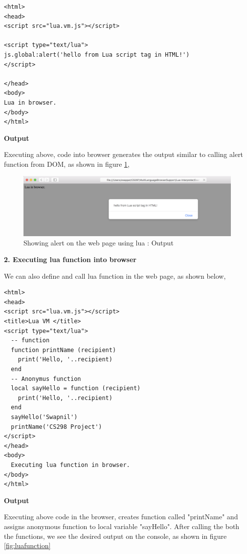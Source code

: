 \begin{lstlisting}[frame=single]
<html>
<head>
<script src="lua.vm.js"></script>

<script type="text/lua">
js.global:alert('hello from Lua script tag in HTML!')
</script>

</head>
<body>
Lua in browser.
</body>
</html>
\end{lstlisting}

\textbf{Output}

Executing above, code into browser generates the output similar to calling alert function from DOM, as shown in figure \ref{fig:luaalert}, 

\begin{figure}[H]
	\begin{center}
		\includegraphics[width=\linewidth]{./images/lua-alert.png}
	\end{center}
	\caption{Showing alert on the web page using lua : Output}
	\label{fig:luaalert}
\end{figure}

\textbf{2. Executing lua function into browser}

We can also define and call lua function in the web page, as shown below,

\begin{lstlisting}[frame=single]  
<html>
<head>
<script src="lua.vm.js"></script>
<title>Lua VM </title>
<script type="text/lua">
  -- function
  function printName (recipient)
    print('Hello, '..recipient)
  end
  -- Anonymus function
  local sayHello = function (recipient)
    print('Hello, '..recipient)
  end
  sayHello('Swapnil')
  printName('CS298 Project')
</script>
</head>
<body>
  Executing lua function in browser.
</body>
</html>
\end{lstlisting}

\textbf{Output}

Executing above code in the browser, creates function called "printName" and assigns anonymous function to local variable "sayHello". After calling the both the functions, we see the desired output on the console, as shown in figure \ref{fig:luafunction}

